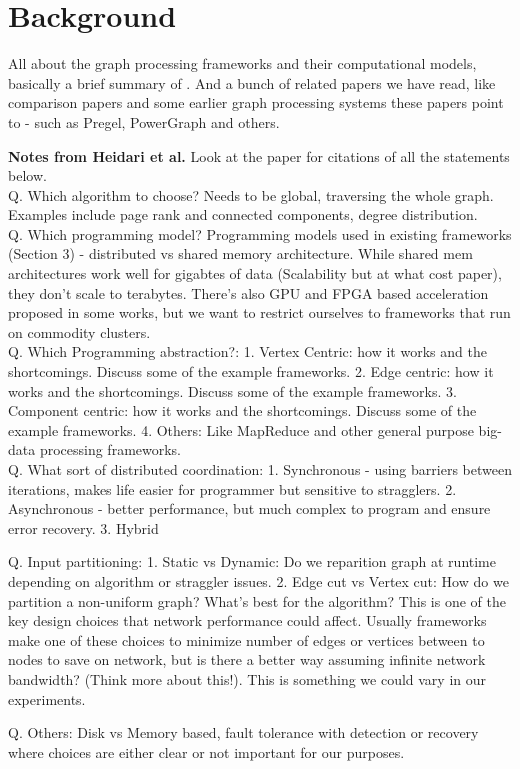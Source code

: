 \section{Background}
\label{sec:background}

All about the graph processing frameworks and their computational models, basically 
a brief summary of \cite{Heidari:2018:SGP:3212709.3199523}. And a bunch of related 
papers we have read, like comparison papers \cite{Guo:2014:WGP:2650283.2650530,
Ammar:2018:EAD:3231751.3242935} and some earlier graph processing systems these papers 
point to - such as Pregel\cite{Malewicz:2010:PSL:1807167.1807184}, PowerGraph
\cite{Gonzalez:2012:PDG:2387880.2387883} and others.



\textbf{Notes from Heidari et al.} \cite{Heidari:2018:SGP:3212709.3199523} Look at the 
paper for citations of all the statements below. \\

Q. Which algorithm to choose?
Needs to be global, traversing the whole graph. Examples include page rank and connected
components, degree distribution. \\

Q. Which programming model? Programming models used in existing frameworks (Section 3) - 
distributed vs shared memory architecture. While shared mem architectures work well for 
gigabtes of data (Scalability but at what cost paper), they don't scale to terabytes. 
There's also GPU and FPGA based acceleration proposed in some works, but we want to 
restrict ourselves to frameworks that run on commodity clusters. \\

Q. Which Programming abstraction?: 
1. Vertex Centric: how it works and the shortcomings. Discuss some of the example frameworks.
2. Edge centric: how it works and the shortcomings. Discuss some of the example frameworks.
3. Component centric: how it works and the shortcomings. Discuss some of the example frameworks.
4. Others: Like MapReduce and other general purpose big-data processing frameworks. \\

Q. What sort of distributed coordination:
1. Synchronous - using barriers between iterations, makes life easier for programmer but 
sensitive to stragglers.
2. Asynchronous - better performance, but much complex to program and ensure error recovery.
3. Hybrid

Q. Input partitioning:
1. Static vs Dynamic: Do we reparition graph at runtime depending on algorithm or straggler issues.
2. Edge cut vs Vertex cut: How do we partition a non-uniform graph? What's best for the algorithm?
This is one of the key design choices that network performance could affect. Usually frameworks make 
one of these choices to minimize number of edges or vertices between to nodes to save on network, but
is there a better way assuming infinite network bandwidth? (Think more about this!). This is something
we could vary in our experiments.

Q. Others: Disk vs Memory based, fault tolerance with detection or recovery where choices are either
clear or not important for our purposes.












